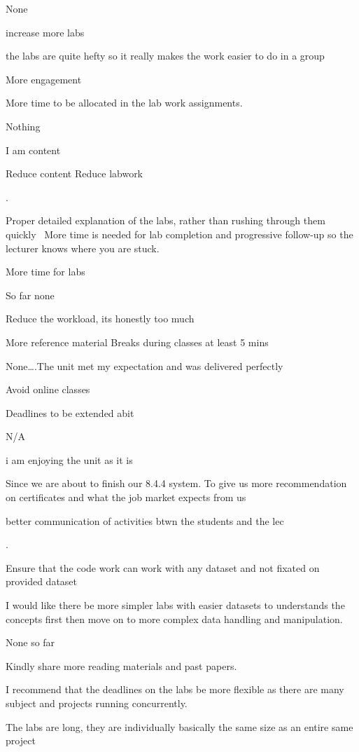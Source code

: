 \documentclass[
]{article}
\begin{document}
\begin{enumerate}
\begin{itemize}
    None~

    increase more labs

    the labs are quite hefty so it really makes the work easier to do in
    a group

    More engagement

    More time to be allocated in the lab work assignments.

    Nothing

    I am content

    Reduce content Reduce labwork

    .

    Proper detailed explanation of the labs, rather than rushing through
    them quickly~ More time is needed for lab completion and progressive
    follow-up so the lecturer knows where you are stuck.

    More time for labs

    So far none

    Reduce the workload, its honestly too much

    More reference material Breaks during classes at least 5 mins ~

    None\ldots.The unit met my expectation and was delivered perfectly

    Avoid online classes

    Deadlines to be extended abit

    N/A

    i am enjoying the unit as it is

    Since we are about to finish our 8.4.4 system. To give us more
    recommendation on certificates and what the job market expects from
    us

    better communication of activities btwn the students and the lec~

    .

    Ensure that the code work can work with any dataset and not fixated
    on provided dataset

    I would like there be more simpler labs with easier datasets to
    understands the concepts first then move on to more complex data
    handling and manipulation.

    None so far

    Kindly share more reading materials and past papers.

    I recommend that the deadlines on the labs be more flexible as there
    are many subject and projects running concurrently.

    The labs are long, they are individually basically the same size as
    an entire same project


\end{itemize}
\end{enumerate}
\end{document}
